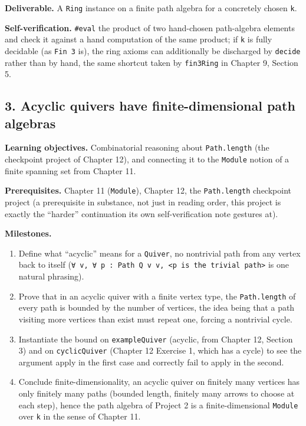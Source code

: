 \textbf{Deliverable.} A \texttt{Ring} instance on a finite path algebra for a concretely chosen \texttt{k}.

\textbf{Self-verification.} \texttt{\#eval} the product of two hand-chosen path-algebra elements and check it against a hand computation of the same product; if \texttt{k} is fully decidable (as \texttt{Fin 3} is), the ring axioms can additionally be discharged by \texttt{decide} rather than by hand, the same shortcut taken by \texttt{fin3Ring} in Chapter 9, Section 5.

\subsection{3. Acyclic quivers have finite-dimensional path algebras}\label{sec:14-next-steps:03-next-projects:4}

\textbf{Learning objectives.} Combinatorial reasoning about \texttt{Path.length} (the checkpoint project of Chapter 12), and connecting it to the \texttt{Module} notion of a finite spanning set from Chapter 11.

\textbf{Prerequisites.} Chapter 11 (\texttt{Module}), Chapter 12, the \texttt{Path.length} checkpoint project (a prerequisite in substance, not just in reading order, this project is exactly the ``harder'' continuation its own self-verification note gestures at).

\textbf{Milestones.}

\begin{enumerate}
\def\labelenumi{\arabic{enumi}.}
\tightlist
\item
  Define what ``acyclic'' means for a \texttt{Quiver}, no nontrivial path from any vertex back to itself (\texttt{∀ v, ∀ p : Path Q v v, <p is the trivial path>} is one natural phrasing).
\item
  Prove that in an acyclic quiver with a finite vertex type, the \texttt{Path.length} of every path is bounded by the number of vertices, the idea being that a path visiting more vertices than exist must repeat one, forcing a nontrivial cycle.
\item
  Instantiate the bound on \texttt{exampleQuiver} (acyclic, from Chapter 12, Section 3) and on \texttt{cyclicQuiver} (Chapter 12 Exercise 1, which has a cycle) to see the argument apply in the first case and correctly fail to apply in the second.
\item
  Conclude finite-dimensionality, an acyclic quiver on finitely many vertices has only finitely many paths (bounded length, finitely many arrows to choose at each step), hence the path algebra of Project 2 is a finite-dimensional \texttt{Module} over \texttt{k} in the sense of Chapter 11.
\end{enumerate}

